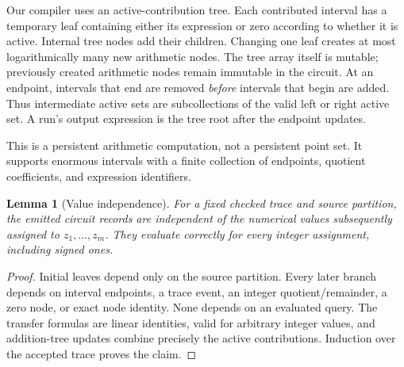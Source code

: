 \documentclass[11pt]{article}
\newtheorem{lemma}[theorem]{Lemma}
\theoremstyle{definition}\newtheorem{definition}[theorem]{Definition}
\theoremstyle{remark}\newtheorem{remark}[theorem]{Remark}
\begin{document}
Our compiler uses an active-contribution tree. Each contributed interval has a
temporary leaf containing either its expression or zero according to whether it
is active. Internal tree nodes add their children. Changing one leaf creates at
most logarithmically many new arithmetic nodes. The tree array itself is mutable;
previously created arithmetic nodes remain immutable in the circuit.
At an endpoint, intervals that end are removed \emph{before} intervals that
begin are added. Thus intermediate active sets are subcollections of the valid
left or right active set. A run's output expression is the tree root after the
endpoint updates.

This is a persistent arithmetic computation, not a persistent point set. It
supports enormous intervals with a finite collection of endpoints, quotient
coefficients, and expression identifiers.

\begin{lemma}[Value independence]
For a fixed checked trace and source partition, the emitted circuit records are
independent of the numerical values subsequently assigned to $z_1,\ldots,z_m$.
They evaluate correctly for every integer assignment, including signed ones.
\end{lemma}
\begin{proof}
Initial leaves depend only on the source partition. Every later branch depends
on interval endpoints, a trace event, an integer quotient/remainder, a zero node,
or exact node identity. None depends on an evaluated query. The transfer formulas
are linear identities, valid for arbitrary integer values, and addition-tree
updates combine precisely the active contributions. Induction over the accepted
trace proves the claim.
\end{proof}
\end{document}
